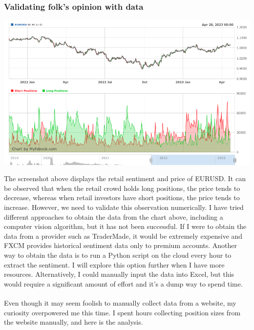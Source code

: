 \documentclass{article}
\begin{document}
\subsubsection{Validating folk's opinion with data}
\begin{center}
    \includegraphics[scale=0.5]{p1.png}    
\end{center}
The screenshot above displays the retail sentiment and price of EURUSD. It can be observed that when the retail crowd holds long positions, the price tends to decrease, whereas when retail investors have short positions, the price tends to increase. However, we need to validate this observation numerically. I have tried different approaches to obtain the data from the chart above, including a computer vision algorithm, but it has not been successful. If I were to obtain the data from a provider such as TraderMade, it would be extremely expensive and FXCM provides historical sentiment data only to premium accounts. Another way to obtain the data is to run a Python script on the cloud every hour to extract the sentiment. I will explore this option further when I have more resources. Alternatively, I could manually input the data into Excel, but this would require a significant amount of effort and it's a dump way to spend time.  \\ \\

Even though it may seem foolish to manually collect data from a website, my curiosity overpowered me this time. I spent hours collecting position sizes from the website manually, and here is the analysis. \\
\end{document}

